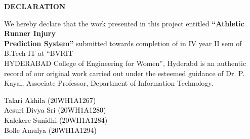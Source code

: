 \documentclass[12pt, English]{article}
\begin{document}
\newcommand{\CC}{C\nolinebreak\hspace{-.05em}\raisebox{.4ex}{\tiny\bf +}\nolinebreak\hspace{-
.10em}\raisebox{.4ex}{\tiny\bf +}}
\def\CC{{C\nolinebreak[4]\hspace{-.05em}\raisebox{.4ex}{\tiny\bf ++}}}
\begin{titlepage}
\begin{center}
\textbf{\LARGE DECLARATION}\\
\end{center}
\vspace*{0.2in}

We hereby declare that the work presented in this project entitled {\textbf{“Athletic Runner Injury \\Prediction System”}} submitted towards completion of in IV year II
sem of B.Tech IT at “BVRIT\\ HYDERABAD College of Engineering for Women”, Hyderabd is an authentic
record of our original work carried out under the esteemed guidance of { Dr. P. Kayal, Associate
Professor}, Department of Information Technology.

\raggedleft
\vspace*{0.5in}

\textcolor{black}{Talari Akhila (20WH1A1267)}\\
\raggedleft
\vspace*{0.3in}
\textcolor{black}{Aesuri Divya Sri (20WH1A1280)}\\
\raggedleft
\vspace*{0.3in}
\textcolor{black}{Kalekere Sunidhi (20WH1A1284)}\\
\raggedleft
\vspace*{0.3in}
\textcolor{black}{Bolle Amulya (20WH1A1294)}\\

\end{titlepage}
\end{document}
